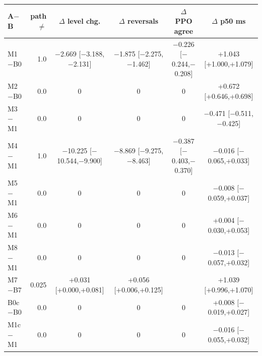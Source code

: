\begin{tabular}{lrcccc}
\toprule
A$-$B & path$\ne$ & $\Delta$ level chg. & $\Delta$ reversals & $\Delta$ PPO agree & $\Delta$ p50 ms\\
\midrule
M1$-$B0 & 1.0 & $-$2.669 [$-$3.188,$-$2.131] & $-$1.875 [$-$2.275,$-$1.462] & $-$0.226 [$-$0.244,$-$0.208] & +1.043 [+1.000,+1.079] \\
M2$-$B0 & 0.0 & 0 & 0 & 0 & +0.672 [+0.646,+0.698] \\
M3$-$M1 & 0.0 & 0 & 0 & 0 & $-$0.471 [$-$0.511,$-$0.425] \\
M4$-$M1 & 1.0 & $-$10.225 [$-$10.544,$-$9.900] & $-$8.869 [$-$9.275,$-$8.463] & $-$0.387 [$-$0.403,$-$0.370] & $-$0.016 [$-$0.065,+0.033] \\
M5$-$M1 & 0.0 & 0 & 0 & 0 & $-$0.008 [$-$0.059,+0.037] \\
M6$-$M1 & 0.0 & 0 & 0 & 0 & +0.004 [$-$0.030,+0.053] \\
M8$-$M1 & 0.0 & 0 & 0 & 0 & $-$0.013 [$-$0.057,+0.032] \\
M7$-$B7 & 0.025 & +0.031 [+0.000,+0.081] & +0.056 [+0.006,+0.125] &  & +1.039 [+0.996,+1.070] \\
B0c$-$B0 & 0.0 & 0 & 0 & 0 & +0.008 [$-$0.019,+0.027] \\
M1c$-$M1 & 0.0 & 0 & 0 & 0 & $-$0.016 [$-$0.055,+0.032] \\
\bottomrule
\end{tabular}
